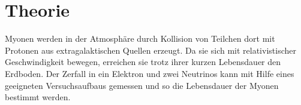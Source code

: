 \section{Theorie}

Myonen werden in der Atmosphäre durch Kollision von Teilchen dort mit Protonen aus extragalaktischen Quellen erzeugt. Da sie sich mit relativistischer Geschwindigkeit bewegen, erreichen sie trotz ihrer kurzen Lebensdauer den Erdboden. Der Zerfall in ein Elektron und zwei Neutrinos kann mit Hilfe eines geeigneten Versuchsaufbaus gemessen und so die Lebensdauer der Myonen bestimmt werden.

